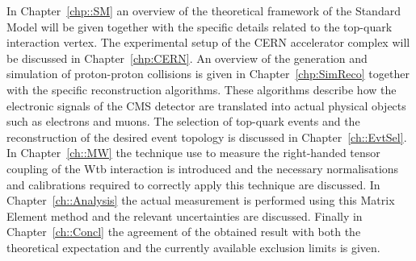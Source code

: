 In Chapter~\ref{chp::SM} an overview of the theoretical framework of the Standard Model will be given together with the specific details related to the top-quark interaction vertex.
The experimental setup of the CERN accelerator complex will be discussed in Chapter~\ref{chp:CERN}.
An overview of the generation and simulation of proton-proton collisions is given in Chapter~\ref{chp:SimReco} together with the specific reconstruction algorithms. These algorithms describe how the electronic signals of the CMS detector are translated into actual physical objects such as electrons and muons.
The selection of top-quark events and the reconstruction of the desired event topology is discussed in Chapter~\ref{ch::EvtSel}.
In Chapter~\ref{ch::MW} the technique use to measure the right-handed tensor coupling of the Wtb interaction is introduced and the necessary normalisations and calibrations required to correctly apply this technique are discussed.
In Chapter~\ref{ch::Analysis} the actual measurement is performed using this Matrix Element method and the relevant uncertainties are discussed.
Finally in Chapter~\ref{ch::Concl} the agreement of the obtained result with both the theoretical expectation and the currently available exclusion limits is given.